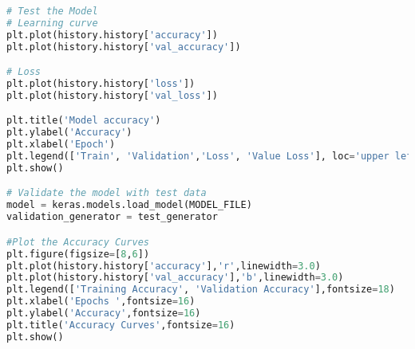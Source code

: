 \begin{lstlisting}[language=Python]
# Test the Model
# Learning curve
plt.plot(history.history['accuracy'])
plt.plot(history.history['val_accuracy'])

# Loss
plt.plot(history.history['loss'])
plt.plot(history.history['val_loss'])

plt.title('Model accuracy')
plt.ylabel('Accuracy')
plt.xlabel('Epoch')
plt.legend(['Train', 'Validation','Loss', 'Value Loss'], loc='upper left')
plt.show()

# Validate the model with test data
model = keras.models.load_model(MODEL_FILE)
validation_generator = test_generator

#Plot the Accuracy Curves
plt.figure(figsize=[8,6])
plt.plot(history.history['accuracy'],'r',linewidth=3.0)
plt.plot(history.history['val_accuracy'],'b',linewidth=3.0)
plt.legend(['Training Accuracy', 'Validation Accuracy'],fontsize=18)
plt.xlabel('Epochs ',fontsize=16)
plt.ylabel('Accuracy',fontsize=16)
plt.title('Accuracy Curves',fontsize=16)
plt.show()
\end{lstlisting}
